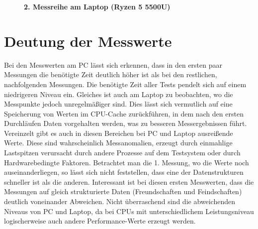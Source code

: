 \documentclass[11pt,a4paper]{article}
\begin{document}
\begin{figure}[H]
    \centering
    \vspace*{-0.8cm}
    \caption{\textbf{2. Messreihe am Laptop (Ryzen 5 5500U)}}
\end{figure}

\clearpage

\section{Deutung der Messwerte}

Bei den Messwerten am PC lässt sich erkennen, dass in den ersten paar Messungen die
benötigte Zeit deutlich höher ist als bei den restlichen, nachfolgenden Messungen.
Die benötigte Zeit aller Tests pendelt sich auf einem niedrigeren Niveau ein.
Gleiches ist auch am Laptop zu beobachten, wo die Messpunkte jedoch unregelmäßiger sind.
Dies lässt sich vermutlich auf eine Speicherung von Werten im CPU-Cache zurückführen,
in dem nach den ersten Durchläufen Daten vorgehalten werden, was zu besseren
Messergebnissen führt.
Vereinzelt gibt es auch in diesen Bereichen bei PC und Laptop ausreißende Werte.
Diese sind wahrscheinlich Messanomalien, erzeugt durch einmahlige Lastspitzen verursacht
durch andere Prozesse auf dem Testsystem oder durch Hardwarebedingte Faktoren.
Betrachtet man die 1. Messung, wo die Werte noch auseinanderliegen,
so lässt sich nicht feststellen, dass eine der Datenstrukturen schneller
ist als die anderen. Interessant ist bei diesen ersten Messwerten, dass die Messungen
auf gleich strukturierte Daten (Freundschaften und Feindschaften) deutlich voneinander
Abweichen. Nicht überraschend sind die abweichenden Niveaus von PC und Laptop,
da bei CPUs mit unterschiedlichem Leistungsniveau logischerweise auch andere
Performance-Werte erzeugt werden.
\end{document}
